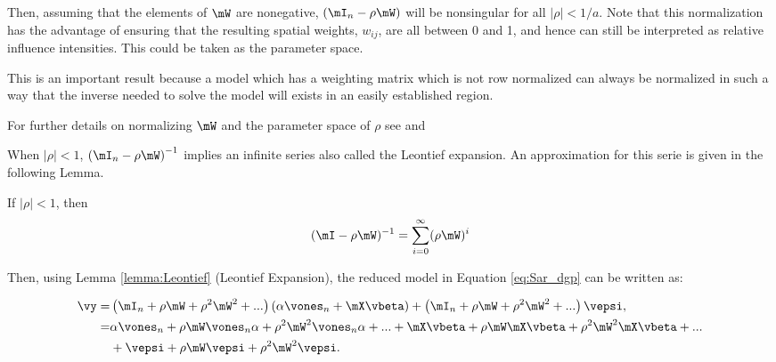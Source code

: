 \documentclass[english,12pt]{book}\usepackage[]{graphicx}\usepackage[]{xcolor}
\begin{document}
Then, assuming that the elements of $\mW$ are nonegative, $(\mI_n - \rho\mW)$ will be nonsingular for all $\left|\rho\right| < 1/a$. Note that this normalization has the advantage of ensuring that the resulting spatial weights, $w_{ij}$, are all between 0 and 1, and hence can still be interpreted as relative influence intensities. This could be taken as the parameter space. 

This is an important result because a model which has a weighting matrix which is not row normalized can always be normalized in such a way that the inverse needed to solve the model will exists in an easily established region. 


\begin{remark}
For further details on normalizing $\mW$ and the parameter space of $\rho$ see \citet[][section 2.4]{elhorst2014spatial} and \citet[][section 2.2]{kelejian2010specification}
\end{remark}

When $\left|\rho\right|< 1$, $\left(\mI_n - \rho\mW\right)^{-1}$ implies an infinite series also called the Leontief expansion. An approximation for this serie is given in the following Lemma.

\begin{lemma}\label{lemma:Leontief}
If $\left|\rho\right|  < 1$, then
	\begin{equation*}
	(\mI - \rho \mW)^{-1} = \sum_{i = 0} ^{\infty}(\rho \mW)^{i}
	\end{equation*}
\end{lemma}

Then, using Lemma \ref{lemma:Leontief} (Leontief Expansion), the reduced model in Equation \eqref{eq:Sar_dgp} can be written as:

\begin{equation}\label{eq:infinite_series_slm}
  \begin{aligned}
      \vy  = &\left(\mI_n + \rho\mW + \rho^2\mW^2 + ...\right)\left(\alpha \vones_n + \mX\vbeta\right) + \left(\mI_n + \rho\mW + \rho^2\mW^2 + ...\right)\vepsi, \\
           = & \alpha\vones_n + \rho\mW\vones_n\alpha + \rho^2\mW^2\vones_n\alpha + ... + \mX\vbeta + \rho\mW\mX\vbeta + \rho^2\mW^2\mX\vbeta + ... \\
          & + \vepsi + \rho\mW\vepsi + \rho^2\mW^2\vepsi.
  \end{aligned}
\end{equation}
\end{document}
